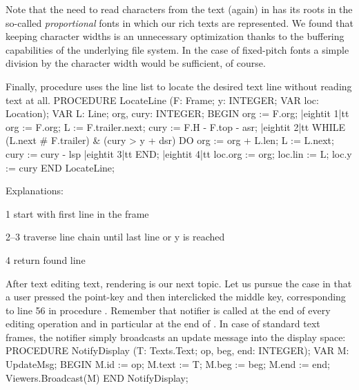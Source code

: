 Note that the need to read characters from the text (again) in  has its roots in the so-called \emph{proportional} fonts in which our rich texts are represented. We found that keeping character widths is an unnecessary optimization thanks to the buffering capabilities of the underlying file system. In the case of fixed-pitch fonts a simple division by the character width would be sufficient, of course.

Finally, procedure  uses the line list to locate the desired text line without reading text at all.
\begintt
PROCEDURE LocateLine (F: Frame; y: INTEGER; VAR loc: Location);
VAR L: Line; org, cury: INTEGER;
BEGIN
  org := F.org;
|eightit 1|tt org := F.org; L := F.trailer.next; cury := F.H - F.top - asr;
|eightit 2|tt WHILE (L.next # F.trailer) & (cury > y + dsr) DO
  org := org + L.len; L := L.next; cury := cury - lsp
|eightit 3|tt END;
|eightit 4|tt loc.org := org; loc.lin := L; loc.y := cury
END LocateLine;
\endtt

\noindent Explanations:

\item{1} start with first line in the frame
\item{2--3} traverse line chain until last line or y is reached
\item{4} return found line

\noindent After text editing text, rendering is our next topic. Let us pursue the case in that a user pressed the point-key and then interclicked the middle key, corresponding to line 56 in procedure . Remember that notifier is called at the end of every editing operation and in particular at the end of . In case of standard text frames, the notifier simply broadcasts an update message into the display space:
\begintt
PROCEDURE NotifyDisplay (T: Texts.Text; op, beg, end: INTEGER);
VAR M: UpdateMsg;
BEGIN
  M.id := op; M.text := T; M.beg := beg; M.end := end;
  Viewers.Broadcast(M)
END NotifyDisplay;
\endtt

